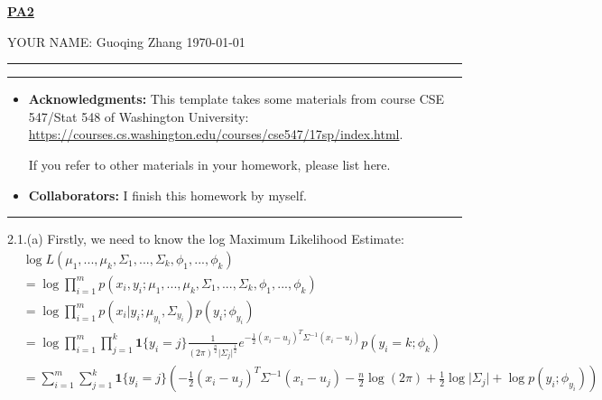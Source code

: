 \documentclass[a4paper]{article}
\begin{document}
\courseheader



\setcounter{hwcnt}{1} %

\begin{center}
  \underline{\bf PA2 } \\
\end{center}
\begin{flushleft}
  YOUR NAME: Guoqing Zhang\hfill
  \today
\end{flushleft}
\hrule

\vspace{2em}

\flushleft
\rule{\textwidth}{1pt}
\begin{itemize}
\item {\bf Acknowledgments: \/} 
  This template takes some materials from course CSE 547/Stat 548 of Washington University: \small{\url{https://courses.cs.washington.edu/courses/cse547/17sp/index.html}}.

  If you refer to other materials in your homework, please list here.
\item {\bf Collaborators: \/}
  I finish this homework by myself.
\end{itemize}
\rule{\textwidth}{1pt}
\vspace{2em}

2.1.(a)
Firstly,  we need to know the log Maximum Likelihood Estimate:
\begin{equation*}
\begin{aligned}
&\log L(\mu_1,...,\mu_k,\Sigma_1,...,\Sigma_k,\phi_1,...,\phi_k)\\
 &= \log \prod_{i=1}^m p(x_i,y_i;\mu_1,...,\mu_k,\Sigma_1,...,\Sigma_k,\phi_1,...,\phi_k)\\
 &=\log \prod_{i=1}^m p(x_i|y_i;\mu_{y_i},\Sigma_{y_i})p(y_i;\phi_{y_i})\\
 &=\log \prod_{i=1}^m \prod_{j=1}^k \mathbf{1}\{y_i=j\} \frac{1}{(2\pi)^{\frac n 2}\vert \Sigma_j\vert ^{\frac 1 2}} e^{-\frac 1 2(x_i-u_j)^T\Sigma^{-1}(x_i-u_j)}p(y_i=k;\phi_{k}) \\
 &= \sum_{i=1}^m  \sum_{j=1}^k \mathbf{1}\{y_i=j\}( - \frac 1 2(x_i-u_j)^T\Sigma^{-1}(x_i-u_j) -\frac n 2 \log (2\pi) + \frac 1 2 \log\vert \Sigma_j\vert+\log p(y_i;\phi_{y_i}))\\
\end{aligned}
\end{equation*}
\end{document}
